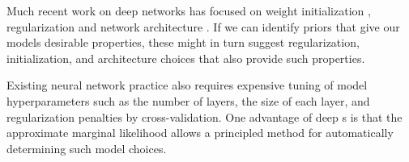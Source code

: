 Much recent work on deep networks has focused on weight initialization \citep{martens2010deep}, regularization \citep{lee2007sparse} and network architecture \citep{gens2013learning}.
If we can identify priors that give our models desirable properties, these might in turn suggest regularization, initialization, and architecture choices that also provide such properties.

Existing neural network practice also requires expensive tuning of model hyperparameters such as the number of layers, the size of each layer, and regularization penalties by cross-validation.
One advantage of deep \gp{}s is that the approximate marginal likelihood allows a principled method for automatically determining such model choices.





